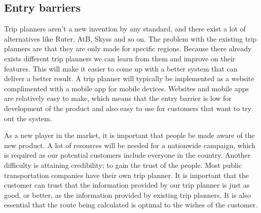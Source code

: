 \subsection{Entry barriers}
Trip planners aren't a new invention by any standard, and there exist a lot of alternatives like Ruter, AtB, Skyss and so on. The problem with the existing trip planners are that they are only made for specific regions.
Because there already exists different trip planners we can learn from them and improve on their features. This will make it easier to come up with a better system that can deliver a better result.
A trip planner will typically be implemented as a website complimented with a mobile app for mobile devices.
Websites and mobile apps are relatively easy to make, which means that the entry barrier is low for development of the product and also easy to use for customers that want to try out the system.

As a new player in the market, it is important that people be made aware of the new product. A lot of resources will be needed for a nationwide campaign, which is required as our potential customers include everyone in the country.
Another difficulty is attaining credibility; to gain the trust of the people.
Most public transportation companies have their own trip planner. It is important that the customer can trust that the information provided by our trip planner is just as good, or better, as the information provided by existing trip planners.
It is also essential that the route being calculated is optimal to the wishes of the customer. 
